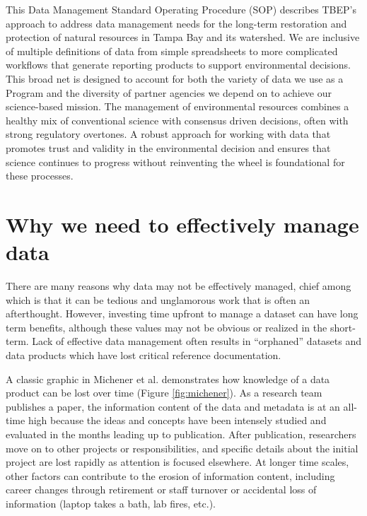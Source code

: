 \documentclass[
]{book}
\begin{document}
This Data Management Standard Operating Procedure (SOP) describes TBEP's approach to address data management needs for the long-term restoration and protection of natural resources in Tampa Bay and its watershed. We are inclusive of multiple definitions of data from simple spreadsheets to more complicated workflows that generate reporting products to support environmental decisions. This broad net is designed to account for both the variety of data we use as a Program and the diversity of partner agencies we depend on to achieve our science-based mission. The management of environmental resources combines a healthy mix of conventional science with consensus driven decisions, often with strong regulatory overtones. A robust approach for working with data that promotes trust and validity in the environmental decision and ensures that science continues to progress without reinventing the wheel is foundational for these processes.

\hypertarget{whymanage}{%
\section{Why we need to effectively manage data}\label{whymanage}}

There are many reasons why data may not be effectively managed, chief among which is that it can be tedious and unglamorous work that is often an afterthought. However, investing time upfront to manage a dataset can have long term benefits, although these values may not be obvious or realized in the short-term. Lack of effective data management often results in ``orphaned'' datasets and data products which have lost critical reference documentation.

A classic graphic in Michener et al. \citep{Michener97} demonstrates how knowledge of a data product can be lost over time (Figure \ref{fig:michener}). As a research team publishes a paper, the information content of the data and metadata is at an all-time high because the ideas and concepts have been intensely studied and evaluated in the months leading up to publication. After publication, researchers move on to other projects or responsibilities, and specific details about the initial project are lost rapidly as attention is focused elsewhere. At longer time scales, other factors can contribute to the erosion of information content, including career changes through retirement or staff turnover or accidental loss of information (laptop takes a bath, lab fires, etc.).
\end{document}
